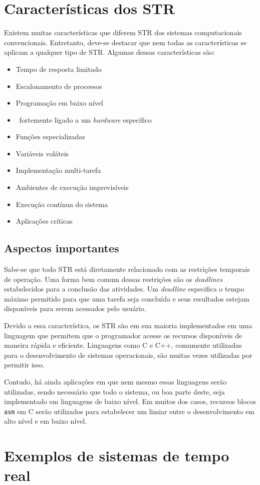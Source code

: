 \section{Características dos STR}
Existem muitas características que diferem STR dos sistemas computacionais
convencionais. Entretanto, deve-se destacar que nem todas as características se
aplicam a qualquer tipo de STR. Algumas dessas características são:

\begin{itemize}
    \item Tempo de resposta limitado
    \item Escalonamento de processos
    \item Programação em baixo nível
    \item \Soft\ fortemente ligado a um {\it hardware} específico
    \item Funções especializadas
    \item Variáveis voláteis
    \item Implementação multi-tarefa
    \item Ambientes de execução imprevisíveis
    \item Execução contínua do sistema
    \item Aplicações críticas
\end{itemize}

\subsection{Aspectos importantes}
Sabe-se que todo STR está diretamente relacionado com as restrições temporais de
operação. Uma forma bem comum dessas restrições são os {\it deadlines}
estabelecidos para a conclusão das atividades. Um {\it deadline} especifica o
tempo máximo permitido para que uma tarefa seja concluída e seus resultados
estejam disponíveis para serem acessados pelo usuário.

Devido a essa característica, os STR são em sua maioria implementados em uma
linguagem que permitem que o programador acesse os recursos disponíveis de
maneira rápida e eficiente. Linguagens como C e C++, comumente utilizadas para o
desenvolvimento de sistemas operacionais, são muitas vezes utilizadas por
permitir isso. 

Contudo, há ainda aplicações em que nem mesmo essas linguagens serão utilizadas,
sendo necessário que todo o sistema, ou boa parte deste, seja implementado em
linguagens de baixo nível. Em muitos dos casos, recursos blocos {\tt asm} em C
serão utilizados para estabelecer um limiar entre o desenvolvimento em alto
nível e em baixo nível.

\section{Exemplos de sistemas de tempo real}
